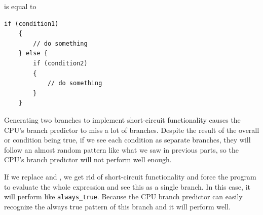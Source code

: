 \documentclass[12pt]{article}
\begin{document}
\begin{itemize}
is equal to

\begin{lstlisting}[style=CStyle]
	if (condition1)
	{
		// do something
	} else {
		if (condition2)
		{
			// do something
		}
	}
\end{lstlisting}

Generating two branches to implement short-circuit functionality causes the CPU's branch predictor to miss a lot of branches. Despite the result of the overall or condition being true, if we see each condition as separate branches, they will follow an almost random pattern like what we saw in previous parts, so the CPU's branch predictor will not perform well enough.

If we replace \codeword{||} and \codeword{|}, we get rid of short-circuit functionality and force the program to evaluate the whole expression and see this as a single branch. In this case, it will perform like \verb+always_true+. Because the CPU branch predictor can easily recognize the always true pattern of this branch and it will perform well.


\end{itemize}

	
\end{document}

